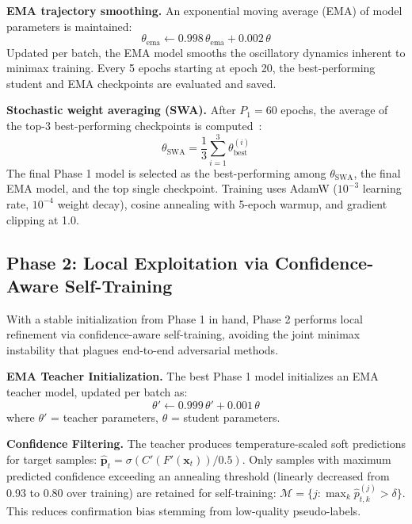 \documentclass[conference]{IEEEtran}
\begin{document}
\textbf{EMA trajectory smoothing.} An exponential moving average (EMA) of model parameters is maintained:
\begin{equation}
    \theta_{\text{ema}} \leftarrow 0.998\,\theta_{\text{ema}} + 0.002\,\theta
\label{eq:ema_phase1}
\end{equation}
Updated per batch, the EMA model smooths the oscillatory dynamics inherent to minimax training. Every 5 epochs starting at epoch 20, the best-performing student and EMA checkpoints are evaluated and saved.

\textbf{Stochastic weight averaging (SWA).} After $P_1=60$ epochs, the average of the top-3 best-performing checkpoints is computed~\cite{izmailov2018averaging}:
\begin{equation}
    \theta_{\text{SWA}} = \frac{1}{3}\sum_{i=1}^{3} \theta^{(i)}_{\text{best}}
\label{eq:swa}
\end{equation}
The final Phase 1 model is selected as the best-performing among $\theta_{\text{SWA}}$, the final EMA model, and the top single checkpoint. Training uses AdamW ($10^{-3}$ learning rate, $10^{-4}$ weight decay), cosine annealing with 5-epoch warmup, and gradient clipping at 1.0.

\subsection{Phase 2: Local Exploitation via Confidence-Aware Self-Training}
\label{sec:phase2}
With a stable initialization from Phase 1 in hand, Phase 2 performs local refinement via confidence-aware self-training, avoiding the joint minimax instability that plagues end-to-end adversarial methods.

\textbf{EMA Teacher Initialization.} The best Phase 1 model initializes an EMA teacher model, updated per batch as:
\begin{equation}
    \theta' \leftarrow 0.999\,\theta' + 0.001\,\theta
\label{eq:ema_phase2}
\end{equation}
where $\theta'$ = teacher parameters, $\theta$ = student parameters.

\textbf{Confidence Filtering.} The teacher produces temperature-scaled soft predictions for target samples: $\hat{\mathbf{p}}_t = \sigma(C'(F'(\mathbf{x}_t))/0.5)$. Only samples with maximum predicted confidence exceeding an annealing threshold (linearly decreased from 0.93 to 0.80 over training) are retained for self-training: $\mathcal{M} = \{j : \max_k \hat{p}_{t,k}^{(j)} > \delta\}$. This reduces confirmation bias stemming from low-quality pseudo-labels.
\end{document}
